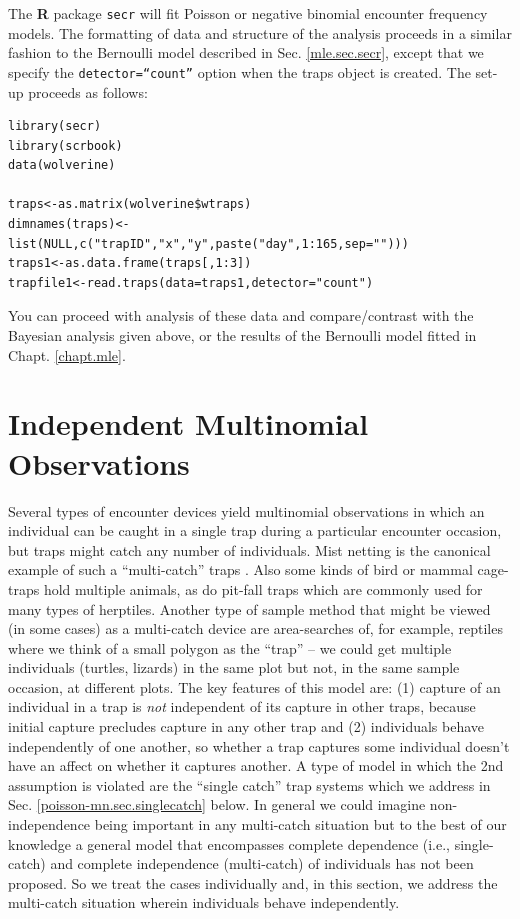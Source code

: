 The {\bf R} package \mbox{\tt secr} will fit Poisson or negative
binomial encounter frequency models. The formatting of data and
structure of the analysis proceeds in a similar fashion to the
Bernoulli model described in Sec. \ref{mle.sec.secr}, except that
we specify the \mbox{\tt detector=``count''} option when the traps
object is created. The set-up proceeds as follows:
\begin{samepage}
{\small
\begin{verbatim}
library(secr)
library(scrbook)
data(wolverine)

traps<-as.matrix(wolverine$wtraps)
dimnames(traps)<-list(NULL,c("trapID","x","y",paste("day",1:165,sep="")))
traps1<-as.data.frame(traps[,1:3])
trapfile1<-read.traps(data=traps1,detector="count")
\end{verbatim}
}
\end{samepage}
You can proceed with analysis of these data and compare/contrast with
the Bayesian analysis given above, or the results of the Bernoulli
model fitted in Chapt. \ref{chapt.mle}.



\section{Independent Multinomial Observations}
\label{poisson-mn.sec.multinomial}

Several types of encounter devices yield multinomial observations in
which an individual can be caught in a single trap during a particular
encounter occasion, but traps might catch any number of individuals.
Mist netting is the canonical example of such a ``multi-catch'' traps
\citep{efford_etal:2009euring}. Also some kinds of bird or mammal
cage-traps hold multiple animals, as do pit-fall traps which are
commonly used for many types of herptiles.  Another type of sample
method that might be viewed (in some cases) as a multi-catch device
are area-searches of, for example, reptiles where we think of a small
polygon as the ``trap'' -- we could get multiple individuals (turtles,
lizards) in the same plot but not, in the same sample occasion, at
different plots.  The key features of this model are: (1) capture of
an individual in a trap is {\it not} independent of its capture in
other traps, because initial capture precludes capture in any other
trap and (2) individuals behave independently of one another, so
whether a trap captures some individual doesn't have an affect on
whether it captures another.  A type of model in which the 2nd
assumption is violated are the ``single catch'' trap systems which we
address in Sec. \ref{poisson-mn.sec.singlecatch} below. In general we
could imagine non-independence being important in any multi-catch
situation but to the best of our knowledge a general model that
encompasses complete dependence (i.e., single-catch) and complete
independence (multi-catch) of individuals has not been proposed.  So
we treat the cases individually and, in this section, we address the
multi-catch situation wherein individuals behave independently.


